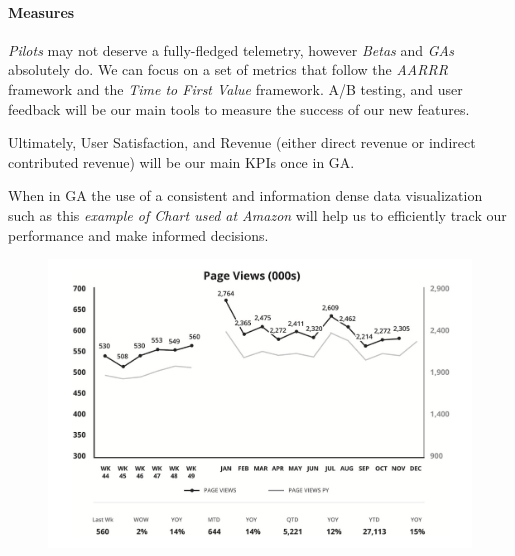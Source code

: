 \documentclass{tufte-handout}
\begin{document}
\paragraph{Measures}\label{sec:measures} \emph{Pilots} may not deserve a fully-fledged telemetry, however \emph{Betas} and \emph{GAs} absolutely do. We can focus on a set of metrics that follow the \emph{AARRR} framework and the \emph{Time to First Value} framework. A/B testing, and user feedback will be our main tools to measure the success of our new features. \par
Ultimately, User Satisfaction, and Revenue (either direct revenue or indirect contributed revenue) will be our main KPIs once in GA.\par
When in GA the use of a consistent and information dense data visualization such as this \emph{example of Chart used at Amazon} will help us to efficiently track our performance and make informed decisions.
  \begin{figure}
    \includegraphics{amazon-page-views-chart.png}
  \end{figure}
\end{document}
